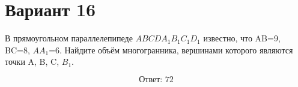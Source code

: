 \documentclass[12pt,a4paper]{article}
\begin{document}
\section*{Вариант 16}

В прямоугольном параллелепипеде \(ABCDA_1B_1C_1D_1\) известно, что AB=9, BC=8, \(AA_1\)=6. Найдите объём многогранника, вершинами которого являются точки A, B, C, \(B_1\).

\begin{center}
\end{center}

\[
\boxed{\text{Ответ: }72}
\]
\end{document}

